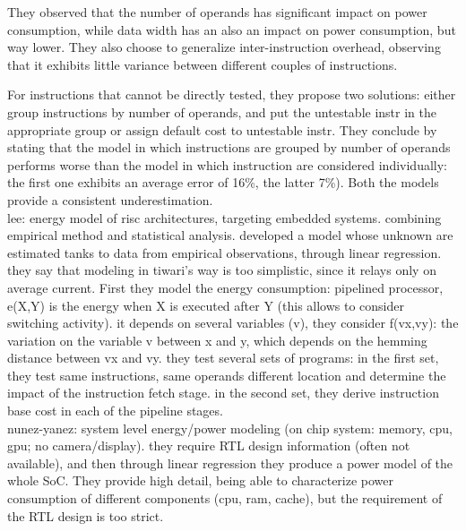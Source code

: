 They observed that the number of operands has significant impact on power consumption, while data width has an also an impact on power consumption, but way lower. They also choose to generalize inter-instruction overhead, observing that it exhibits little variance between different couples of instructions. \par 
For instructions that cannot be directly tested, they propose two solutions: either group instructions by number of operands, and put the untestable instr in the appropriate group or assign default cost to untestable instr. \newline
They conclude by stating that the model in which instructions are grouped by number of operands performs worse than the model in which instruction are considered individually: the first one exhibits an average error of 16\%, the latter 7\%). Both the models provide a consistent underestimation. \\[1in]


lee: energy model of risc architectures, targeting embedded systems. combining empirical method and statistical analysis.
developed a model whose unknown are estimated tanks to data from empirical observations, through linear regression. they say that modeling in tiwari's way is too simplistic, since it relays only on average current.  
First they model the energy consumption: pipelined processor, e(X,Y) is the energy when X is executed after Y (this allows to consider switching activity). it depends on several variables (v), they consider f(vx,vy): the variation on the variable v between x and y, which depends on the hemming distance between vx and vy. 
they test several sets of programs: in the first set, they test same instructions, same operands different location and determine the impact of the instruction fetch stage. in the second set, they derive instruction base cost in each of the pipeline stages. \\[1in]


nunez-yanez: system level energy/power modeling (on chip system: memory, cpu, gpu; no camera/display). they require RTL design information (often not available), and then through linear regression they produce a power model of the whole SoC. They provide high detail, being able to characterize power consumption of different components (cpu, ram, cache), but the requirement of the RTL design is too strict. \\[1in]


